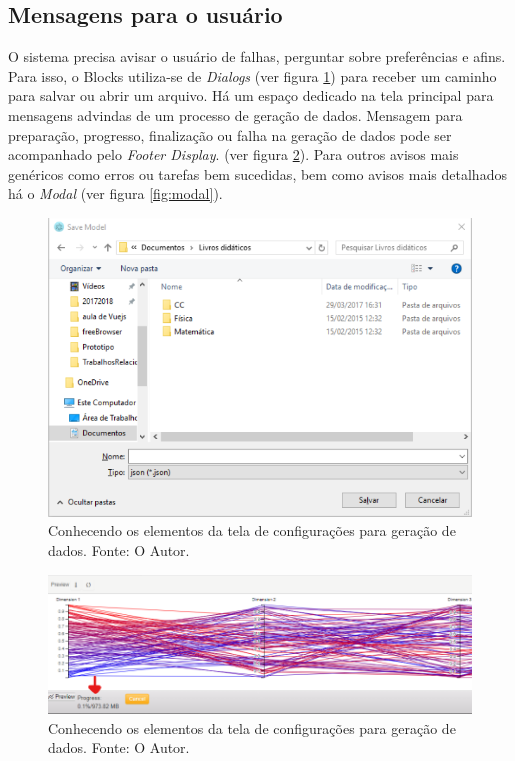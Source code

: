 \documentclass[
	12pt,				%
	openright,			%
	twoside,			%
	a4paper,			%
	english,			%
	brazil				%
	]{abntex2}
\begin{document}
		\subsection{Mensagens para o usuário}
			O sistema precisa avisar o usuário de falhas, perguntar sobre preferências e afins.
			Para isso, o Blocks utiliza-se de \emph{Dialogs} (ver figura \ref{fig:dialog}) para receber um caminho para salvar ou abrir um arquivo.
			Há um espaço dedicado na tela principal para mensagens advindas de um processo de geração de dados.
			Mensagem para preparação, progresso, finalização ou falha na geração de dados pode ser acompanhado pelo \emph{Footer Display}. (ver figura \ref{fig:SDvisor}).
			Para outros avisos mais genéricos como erros ou tarefas bem sucedidas, bem como avisos mais detalhados há o \emph{Modal} (ver figura \ref{fig:modal}).
			\begin{figure}[h]
				\centering
				\includegraphics[width=\linewidth]{./figures/prototipo/dialog.png}
				\caption{Conhecendo os elementos da tela de configurações para geração de dados. Fonte: O Autor.}
				\label{fig:dialog}
			\end{figure}
			\begin{figure}[h]
				\centering
				\includegraphics[width=\linewidth]{./figures/prototipo/SDvisor.png}
				\caption{Conhecendo os elementos da tela de configurações para geração de dados. Fonte: O Autor.}
				\label{fig:SDvisor}
			\end{figure}
\end{document}
